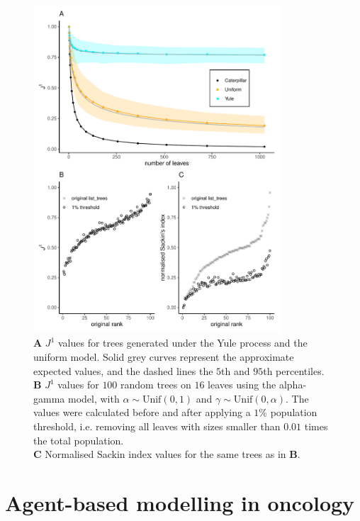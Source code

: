\begin{figure}[h]
    \centering
    \includegraphics[width=0.82\textwidth]{Chapter_1/figures/old_j1_paper_figure.pdf}
    \caption{\textbf{A} $J^1$ values for trees generated under the Yule process and
    the uniform model. Solid grey curves represent the approximate expected values, and
    the dashed lines the $5$th and $95$th percentiles. \\
    \textbf{B} $J^1$ values for $100$ random
    trees on $16$ leaves using the alpha-gamma model, with $\alpha\sim \text{Unif}(0,1)$
    and $\gamma\sim \text{Unif}(0,\alpha)$. The values were
    calculated before and after applying a $1\%$ population threshold, i.e. removing all leaves
    with sizes smaller than $0.01$ times the total population.\\
    \textbf{C} Normalised Sackin index values for the same trees as in \textbf{B}.}
    \label{fig:robustness}
\end{figure}
\clearpage


\section{Agent-based modelling in oncology}\label{section:abm}

